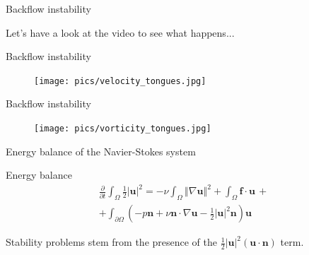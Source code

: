 \documentclass{beamer}
\begin{document}
\begin{frame}{Backflow instability}

\alert{Let's have a look at the video to see what happens...}

\end{frame}

\begin{frame}{Backflow instability}

	\begin{figure}
		\texttt{[image: pics/velocity\_tongues.jpg]}
	\end{figure}

\end{frame}

\begin{frame}{Backflow instability}

	\begin{figure}
		\texttt{[image: pics/vorticity\_tongues.jpg]}
	\end{figure}

\end{frame}

\begin{frame}{Energy balance of the Navier-Stokes system}

	\begin{block}{Energy balance}
		\begin{multline}
			\frac{\partial}{\partial t}\int_{\Omega}\frac{1}{2}\left|\mathbf{u}\right|^{2}=-\nu\int_{\Omega}\left\Vert \nabla\mathbf{u}\right\Vert^{2}+\int_{\Omega}\mathbf{f}\cdot\mathbf{u}\,+ \\
			+\int_{\partial\Omega}\left(-p\mathbf{n}+\nu\mathbf{n}\cdot\nabla\mathbf{u}-\frac{1}{2}\left|\mathbf{u}\right|^{2}\mathbf{n}\right)\mathbf{u}
		\end{multline}
	\end{block}
	Stability problems stem from the presence of the $\frac{1}{2}\left|\mathbf{u}\right|^{2}\left(\mathbf{u}\cdot\mathbf{n}\right)$ term.
	
\end{frame}
\end{document}
